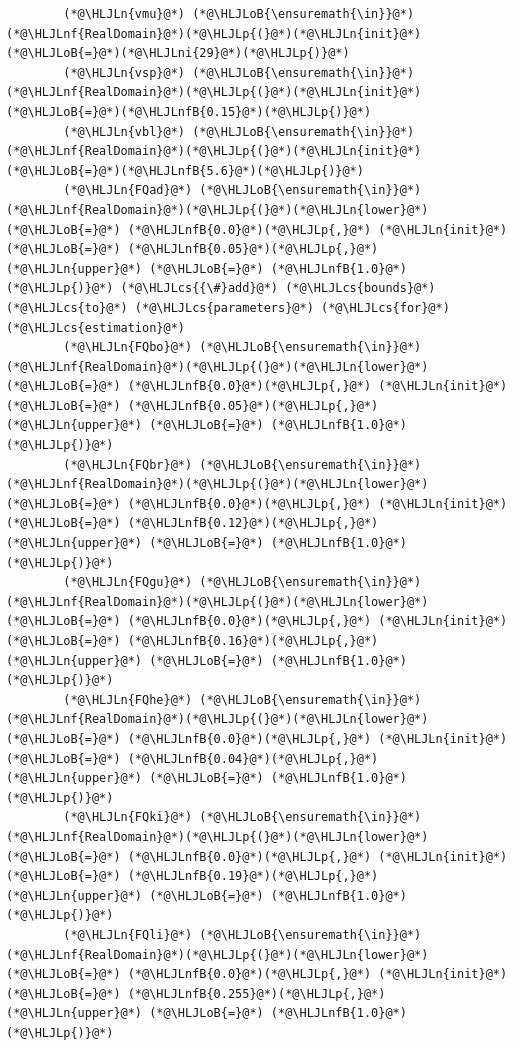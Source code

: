 \documentclass[12pt,a4paper]{article}
\newcommand{\HLJLn}[1]{#1}
\newcommand{\HLJLnf}[1]{\textcolor[RGB]{66,102,213}{#1}}
\newcommand{\HLJLnfB}[1]{\textcolor[RGB]{59,151,46}{#1}}
\newcommand{\HLJLni}[1]{\textcolor[RGB]{59,151,46}{#1}}
\newcommand{\HLJLoB}[1]{\textcolor[RGB]{102,102,102}{\textbf{#1}}}
\newcommand{\HLJLp}[1]{#1}
\newcommand{\HLJLcs}[1]{\textcolor[RGB]{153,153,119}{\textit{#1}}}
\begin{document}
\begin{lstlisting}
        (*@\HLJLn{vmu}@*) (*@\HLJLoB{\ensuremath{\in}}@*) (*@\HLJLnf{RealDomain}@*)(*@\HLJLp{(}@*)(*@\HLJLn{init}@*) (*@\HLJLoB{=}@*)(*@\HLJLni{29}@*)(*@\HLJLp{)}@*)
        (*@\HLJLn{vsp}@*) (*@\HLJLoB{\ensuremath{\in}}@*) (*@\HLJLnf{RealDomain}@*)(*@\HLJLp{(}@*)(*@\HLJLn{init}@*) (*@\HLJLoB{=}@*)(*@\HLJLnfB{0.15}@*)(*@\HLJLp{)}@*)
        (*@\HLJLn{vbl}@*) (*@\HLJLoB{\ensuremath{\in}}@*) (*@\HLJLnf{RealDomain}@*)(*@\HLJLp{(}@*)(*@\HLJLn{init}@*) (*@\HLJLoB{=}@*)(*@\HLJLnfB{5.6}@*)(*@\HLJLp{)}@*)
        (*@\HLJLn{FQad}@*) (*@\HLJLoB{\ensuremath{\in}}@*) (*@\HLJLnf{RealDomain}@*)(*@\HLJLp{(}@*)(*@\HLJLn{lower}@*) (*@\HLJLoB{=}@*) (*@\HLJLnfB{0.0}@*)(*@\HLJLp{,}@*) (*@\HLJLn{init}@*) (*@\HLJLoB{=}@*) (*@\HLJLnfB{0.05}@*)(*@\HLJLp{,}@*) (*@\HLJLn{upper}@*) (*@\HLJLoB{=}@*) (*@\HLJLnfB{1.0}@*)(*@\HLJLp{)}@*) (*@\HLJLcs{{\#}add}@*) (*@\HLJLcs{bounds}@*) (*@\HLJLcs{to}@*) (*@\HLJLcs{parameters}@*) (*@\HLJLcs{for}@*) (*@\HLJLcs{estimation}@*)
        (*@\HLJLn{FQbo}@*) (*@\HLJLoB{\ensuremath{\in}}@*) (*@\HLJLnf{RealDomain}@*)(*@\HLJLp{(}@*)(*@\HLJLn{lower}@*) (*@\HLJLoB{=}@*) (*@\HLJLnfB{0.0}@*)(*@\HLJLp{,}@*) (*@\HLJLn{init}@*) (*@\HLJLoB{=}@*) (*@\HLJLnfB{0.05}@*)(*@\HLJLp{,}@*) (*@\HLJLn{upper}@*) (*@\HLJLoB{=}@*) (*@\HLJLnfB{1.0}@*)(*@\HLJLp{)}@*)
        (*@\HLJLn{FQbr}@*) (*@\HLJLoB{\ensuremath{\in}}@*) (*@\HLJLnf{RealDomain}@*)(*@\HLJLp{(}@*)(*@\HLJLn{lower}@*) (*@\HLJLoB{=}@*) (*@\HLJLnfB{0.0}@*)(*@\HLJLp{,}@*) (*@\HLJLn{init}@*) (*@\HLJLoB{=}@*) (*@\HLJLnfB{0.12}@*)(*@\HLJLp{,}@*) (*@\HLJLn{upper}@*) (*@\HLJLoB{=}@*) (*@\HLJLnfB{1.0}@*)(*@\HLJLp{)}@*)
        (*@\HLJLn{FQgu}@*) (*@\HLJLoB{\ensuremath{\in}}@*) (*@\HLJLnf{RealDomain}@*)(*@\HLJLp{(}@*)(*@\HLJLn{lower}@*) (*@\HLJLoB{=}@*) (*@\HLJLnfB{0.0}@*)(*@\HLJLp{,}@*) (*@\HLJLn{init}@*) (*@\HLJLoB{=}@*) (*@\HLJLnfB{0.16}@*)(*@\HLJLp{,}@*) (*@\HLJLn{upper}@*) (*@\HLJLoB{=}@*) (*@\HLJLnfB{1.0}@*)(*@\HLJLp{)}@*)
        (*@\HLJLn{FQhe}@*) (*@\HLJLoB{\ensuremath{\in}}@*) (*@\HLJLnf{RealDomain}@*)(*@\HLJLp{(}@*)(*@\HLJLn{lower}@*) (*@\HLJLoB{=}@*) (*@\HLJLnfB{0.0}@*)(*@\HLJLp{,}@*) (*@\HLJLn{init}@*) (*@\HLJLoB{=}@*) (*@\HLJLnfB{0.04}@*)(*@\HLJLp{,}@*) (*@\HLJLn{upper}@*) (*@\HLJLoB{=}@*) (*@\HLJLnfB{1.0}@*)(*@\HLJLp{)}@*)
        (*@\HLJLn{FQki}@*) (*@\HLJLoB{\ensuremath{\in}}@*) (*@\HLJLnf{RealDomain}@*)(*@\HLJLp{(}@*)(*@\HLJLn{lower}@*) (*@\HLJLoB{=}@*) (*@\HLJLnfB{0.0}@*)(*@\HLJLp{,}@*) (*@\HLJLn{init}@*) (*@\HLJLoB{=}@*) (*@\HLJLnfB{0.19}@*)(*@\HLJLp{,}@*) (*@\HLJLn{upper}@*) (*@\HLJLoB{=}@*) (*@\HLJLnfB{1.0}@*)(*@\HLJLp{)}@*)
        (*@\HLJLn{FQli}@*) (*@\HLJLoB{\ensuremath{\in}}@*) (*@\HLJLnf{RealDomain}@*)(*@\HLJLp{(}@*)(*@\HLJLn{lower}@*) (*@\HLJLoB{=}@*) (*@\HLJLnfB{0.0}@*)(*@\HLJLp{,}@*) (*@\HLJLn{init}@*) (*@\HLJLoB{=}@*) (*@\HLJLnfB{0.255}@*)(*@\HLJLp{,}@*) (*@\HLJLn{upper}@*) (*@\HLJLoB{=}@*) (*@\HLJLnfB{1.0}@*)(*@\HLJLp{)}@*)

\end{lstlisting}
\end{document}
